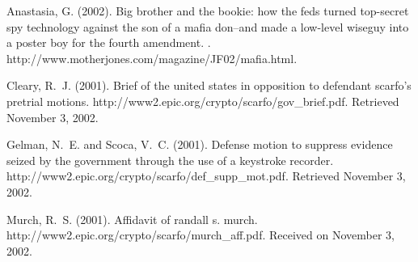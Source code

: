 ﻿\documentclass[12pt,titlepage]{article}             %
\begin{document}
\begin{thebibliography}{}

Anastasia, G. (2002).
\newblock Big brother and the bookie: how the feds turned top-secret spy
  technology against the son of a mafia don--and made a low-level wiseguy into
  a poster boy for the fourth amendment.
.
\newblock http://www.motherjones.com/magazine/JF02/mafia.html.

Cleary, R.~J. (2001).
\newblock Brief of the united states in opposition to defendant scarfo's
  pretrial motions.
\newblock http://www2.epic.org/crypto/scarfo/gov\_brief.pdf.
\newblock Retrieved November 3, 2002.

Gelman, N.~E. and Scoca, V.~C. (2001).
\newblock Defense motion to suppress evidence seized by the government through
  the use of a keystroke recorder.
\newblock http://www2.epic.org/crypto/scarfo/def\_supp\_mot.pdf.
\newblock Retrieved November 3, 2002.

Murch, R.~S. (2001).
\newblock Affidavit of randall s. murch.
\newblock http://www2.epic.org/crypto/scarfo/murch\_aff.pdf.
\newblock Received on November 3, 2002.

\end{thebibliography}
\end{document}
